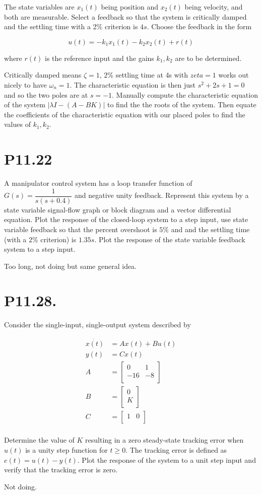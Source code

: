 \documentclass[11pt]{article}
\begin{document}
The state variables are $x_1(t)$ being position and $x_2(t)$ being velocity, and both are measurable. Select a feedback so that the system is critically damped and the settling time with a 2\% criterion is $4s$. Choose the feedback in the form

\[ u(t) = -k_1 x_1(t) - k_2 x_2(t) + r(t) \]

where $r(t)$ is the reference input and the gains $k_1, k_2$ are to be determined.

Critically damped means $\zeta = 1$, 2\% settling time at 4s with $zeta = 1$ works out nicely to have $\omega_n = 1$. The characteristic equation is then just $s^2 + 2s + 1 = 0$ and so the two poles are at $s = -1$. Manually compute the characteristic equation of the system $|\lambda I - (A - BK)|$ to find the the roots of the system. Then equate the coefficients of the characteristic equation with our placed poles to find the values of $k_1, k_2$.

\section{P11.22}

A manipulator control system has a loop transfer function of $G(s) = \dfrac{1}{s(s + 0.4)}$ and negative unity feedback. Represent this system by a state variable signal-flow graph or block diagram and a vector differential equation. Plot the response of the closed-loop system to a step input, use state variable feedback so that the percent overshoot is $5\%$ and and the settling time (with a $2\%$ criterion) is $1.35s$. Plot the response of the state variable feedback system to a step input.

Too long, not doing but same general idea.

\section{P11.28.}

Consider the single-input, single-output system described by 

\begin{align*}
  \dot{x(t)} &= A x(t) + B u(t) \\
  y(t) &= C x(t) \\
  A &= \begin{bmatrix}
    0 & 1 \\
    -16 & -8 \\
  \end{bmatrix} \\
  B &= \begin{bmatrix}
    0 \\
    K \\
  \end{bmatrix} \\
  C &= \begin{bmatrix}
    1 & 0 \\
  \end{bmatrix} \\
\end{align*}

Determine the value of $K$ resulting in a zero steady-state tracking error when $u(t)$ is a unity step function for $t \geq 0$. The tracking error is defined as $e(t) = u(t) - y(t)$. Plot the response of the system to a unit step input and verify that the tracking error is zero.

Not doing.
\end{document}
